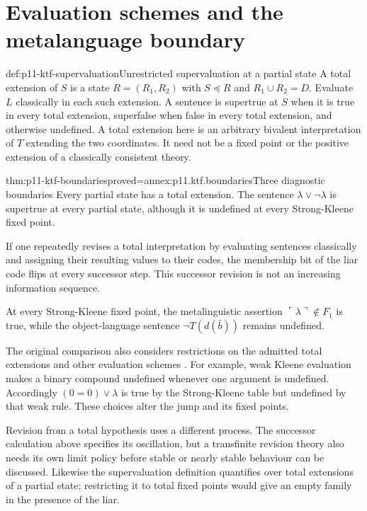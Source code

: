 \section{Evaluation schemes and the metalanguage boundary}

\begin{hbdefinition}{def:p11-ktf-supervaluation}{Unrestricted supervaluation at a partial state}
A total extension of \(S\) is a state \(R=(R_1,R_2)\) with
\(S\preceq R\) and \(R_1\cup R_2=D\). Evaluate \(L\) classically in
each such extension. A sentence is supertrue at \(S\) when it is true in
every total extension, superfalse when false in every total extension,
and otherwise undefined. A total extension here is an arbitrary bivalent
interpretation of \(T\) extending the two coordinates. It need not be a
fixed point or the positive extension of a classically consistent theory.
\end{hbdefinition}

\begin{hbtheorem}{thm:p11-ktf-boundaries}{proved=annex:p11.ktf.boundaries}{Three diagnostic boundaries}
Every partial state has a total extension. The sentence
\(\lambda\lor\neg\lambda\) is supertrue at every partial state,
although it is undefined at every Strong-Kleene fixed point.

If one repeatedly revises a total interpretation by evaluating sentences
classically and assigning their resulting values to their codes, the
membership bit of the liar code flips at every successor step.
This successor revision is not an increasing information sequence.

At every Strong-Kleene fixed point, the metalinguistic assertion
\(\ulcorner\lambda\urcorner\notin F_1\) is true, while the
object-language sentence \(\neg T(d(\bar b))\) remains undefined.
\end{hbtheorem}

The original comparison also considers restrictions on the admitted total
extensions and other evaluation schemes
\cite[pp.~711--712]{Kripke1975}. For example, weak Kleene evaluation makes a
binary compound undefined whenever one argument is undefined. Accordingly
\((0=0)\lor\lambda\) is true by the Strong-Kleene table but undefined
by that weak rule. These choices alter the jump and its fixed points.

Revision from a total hypothesis uses a different process. The successor
calculation above specifies its oscillation, but a transfinite revision
theory also needs its own limit policy before stable or nearly stable
behaviour can be discussed. Likewise the supervaluation definition
quantifies over total extensions of a partial state; restricting it to
total fixed points would give an empty family in the presence of the liar.

